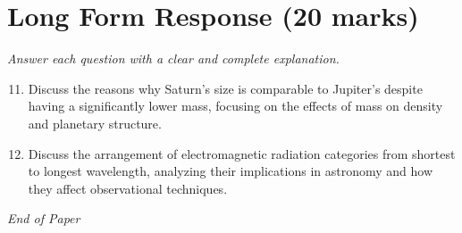 \documentclass[12pt]{article}
\begin{document}
\section*{Long Form Response (20 marks)}
\textit{Answer each question with a clear and complete explanation.}
\begin{enumerate}[label=\arabic*.]
\setcounter{enumi}{10}
\item Discuss the reasons why Saturn's size is comparable to Jupiter's despite having a significantly lower mass, focusing on the effects of mass on density and planetary structure.
\item Discuss the arrangement of electromagnetic radiation categories from shortest to longest wavelength, analyzing their implications in astronomy and how they affect observational techniques.
\end{enumerate}

\vfill
\noindent\textit{End of Paper}
\end{document}
